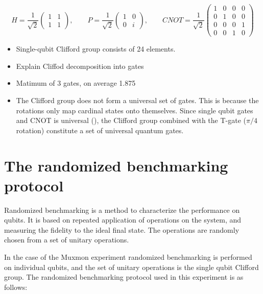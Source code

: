       \begin{equation}
        H =
        \frac{1}{\sqrt{2}}
        \begin{pmatrix}
          1 & 1 \\
          1 & 1
        \end{pmatrix}, \qquad
        P =
        \frac{1}{\sqrt{2}}
        \begin{pmatrix}
          1 & 0 \\
          0 & i
        \end{pmatrix}, \qquad
        CNOT =
        \frac{1}{\sqrt{2}}
        \begin{pmatrix}
          1 & 0 & 0 & 0 \\
          0 & 1 & 0 & 0 \\
          0 & 0 & 0 & 1 \\
          0 & 0 & 1 & 0
        \end{pmatrix}
      \end{equation}


      \begin{itemize}
        \item Single-qubit Clifford group consists of 24 elements.
        \item Explain Cliffod decomposition into gates
        \item Matimum of 3 gates, on average 1.875
        \item The Clifford group does not form a universal set of gates. This is because the rotations only map cardinal states onto themselves. Since single qubit gates and CNOT is universal (\cite{nielsen2010quantum}), the Clifford group combined with the T-gate ($\pi/4$ rotation) constitute a set of universal quantum gates.
      \end{itemize}

    \section{The randomized benchmarking protocol}
      \label{sec:randomized benchmarking protocol}
      Randomized benchmarking is a method to characterize the performance on qubits. It is based on repeated application of operations on the system, and measuring the fidelity to the ideal final state. The operations are randomly chosen from a set of unitary operations.

      In the case of the Muxmon experiment randomized benchmarking is performed on individual qubits, and the set of unitary operations is the single qubit Clifford group. The randomized benchmarking protocol used in this experiment is as follows:

